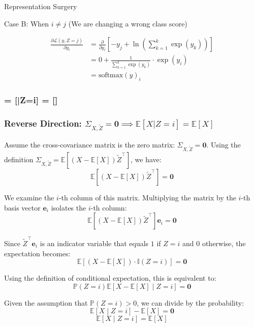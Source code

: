 \begin{question}{Representation Surgery}
\begin{subquestion}
Case B: When $i \neq j$ (We are changing a wrong class score)

\begin{align*}
\frac{\partial \mathcal{L}(y, Z=j)}{\partial y_i} &= \frac{\partial}{\partial y_i} \left[ -y_j + \ln\left(\sum_{k=1}^k \exp(y_k)\right) \right] \\
&= 0 + \frac{1}{\sum_{k=1}^k \exp(y_k)} \cdot \exp(y_i) \\
&= \text{softmax}(y)_i
\end{align*}

\end{subquestion}

\begin{subquestion}

\end{subquestion}

\begin{subquestion}

\subsubsection*{\SigXZ =  \implies {}[\X|Z=i] = [\X]}

\subsubsection*{Reverse Direction: $\Sigma_{X,\tilde{Z}} = \mathbf{0} \implies \mathbb{E}[X|Z=i] = \mathbb{E}[X]$}

Assume the cross-covariance matrix is the zero matrix: $\Sigma_{X,\tilde{Z}} = \mathbf{0}$. 
Using the definition $\Sigma_{X,\tilde{Z}} = \mathbb{E}[(X - \mathbb{E}[X])\tilde{Z}^\top]$, we have:
\[ \mathbb{E}[(X - \mathbb{E}[X])\tilde{Z}^\top] = \mathbf{0} \]

We examine the $i$-th column of this matrix. Multiplying the matrix by the $i$-th basis vector $\mathbf{e}_i$ isolates the $i$-th column:
\[ \mathbb{E}[(X - \mathbb{E}[X])\tilde{Z}^\top] \mathbf{e}_i = \mathbf{0} \]

Since $\tilde{Z}^\top \mathbf{e}_i$ is an indicator variable that equals $1$ if $Z=i$ and $0$ otherwise, the expectation becomes:
\[ \mathbb{E}[(X - \mathbb{E}[X]) \cdot \mathbb{I}(Z=i)] = \mathbf{0} \]

Using the definition of conditional expectation, this is equivalent to:
\[ \mathbb{P}(Z=i) \mathbb{E}[X - \mathbb{E}[X] \mid Z=i] = \mathbf{0} \]

Given the assumption that $\mathbb{P}(Z=i) > 0$, we can divide by the probability:
\[ \mathbb{E}[X \mid Z=i] - \mathbb{E}[X] = \mathbf{0} \]
\[ \mathbb{E}[X \mid Z=i] = \mathbb{E}[X] \]


\end{subquestion}
\end{question}
